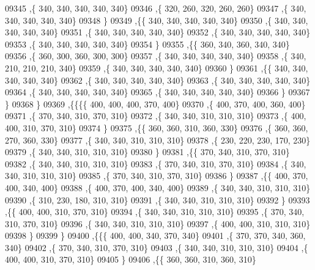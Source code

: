 \begin{DoxyCode}
09345     ,\{   340,   340,   340,   340,   340\}
09346     ,\{   320,   260,   320,   260,   260\}
09347     ,\{   340,   340,   340,   340,   340\}
09348     \}
09349    ,\{\{   340,   340,   340,   340,   340\}
09350     ,\{   340,   340,   340,   340,   340\}
09351     ,\{   340,   340,   340,   340,   340\}
09352     ,\{   340,   340,   340,   340,   340\}
09353     ,\{   340,   340,   340,   340,   340\}
09354     \}
09355    ,\{\{   360,   340,   360,   340,   340\}
09356     ,\{   360,   300,   360,   300,   300\}
09357     ,\{   340,   340,   340,   340,   340\}
09358     ,\{   340,   210,   210,   210,   340\}
09359     ,\{   340,   340,   340,   340,   340\}
09360     \}
09361    ,\{\{   340,   340,   340,   340,   340\}
09362     ,\{   340,   340,   340,   340,   340\}
09363     ,\{   340,   340,   340,   340,   340\}
09364     ,\{   340,   340,   340,   340,   340\}
09365     ,\{   340,   340,   340,   340,   340\}
09366     \}
09367    \}
09368   \}
09369  ,\{\{\{\{   400,   400,   400,   370,   400\}
09370     ,\{   400,   370,   400,   360,   400\}
09371     ,\{   370,   340,   310,   370,   310\}
09372     ,\{   340,   340,   310,   310,   310\}
09373     ,\{   400,   400,   310,   370,   310\}
09374     \}
09375    ,\{\{   360,   360,   310,   360,   330\}
09376     ,\{   360,   360,   270,   360,   330\}
09377     ,\{   340,   340,   310,   310,   310\}
09378     ,\{   230,   220,   230,   170,   230\}
09379     ,\{   340,   340,   310,   310,   310\}
09380     \}
09381    ,\{\{   370,   340,   310,   370,   310\}
09382     ,\{   340,   340,   310,   310,   310\}
09383     ,\{   370,   340,   310,   370,   310\}
09384     ,\{   340,   340,   310,   310,   310\}
09385     ,\{   370,   340,   310,   370,   310\}
09386     \}
09387    ,\{\{   400,   370,   400,   340,   400\}
09388     ,\{   400,   370,   400,   340,   400\}
09389     ,\{   340,   340,   310,   310,   310\}
09390     ,\{   310,   230,   180,   310,   310\}
09391     ,\{   340,   340,   310,   310,   310\}
09392     \}
09393    ,\{\{   400,   400,   310,   370,   310\}
09394     ,\{   340,   340,   310,   310,   310\}
09395     ,\{   370,   340,   310,   370,   310\}
09396     ,\{   340,   340,   310,   310,   310\}
09397     ,\{   400,   400,   310,   310,   310\}
09398     \}
09399    \}
09400   ,\{\{\{   400,   400,   340,   370,   340\}
09401     ,\{   370,   370,   340,   360,   340\}
09402     ,\{   370,   340,   310,   370,   310\}
09403     ,\{   340,   340,   310,   310,   310\}
09404     ,\{   400,   400,   310,   370,   310\}
09405     \}
09406    ,\{\{   360,   360,   310,   360,   310\}

\end{DoxyCode}

